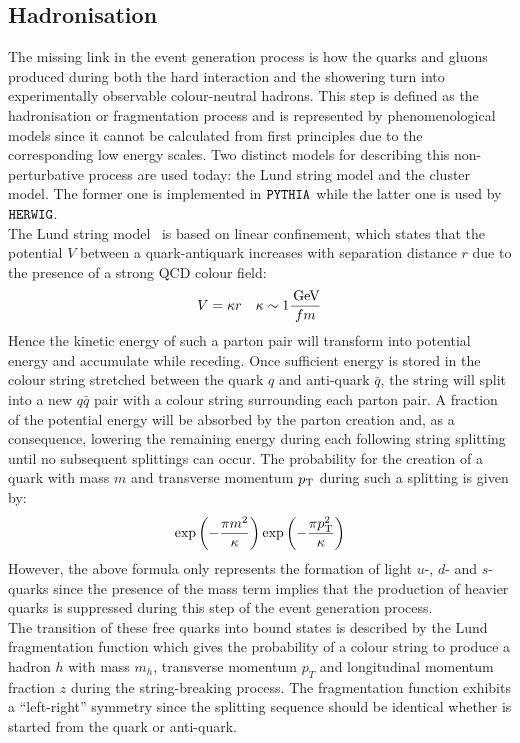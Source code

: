 \subsection{Hadronisation} \label{sec::Hadronisation}
The missing link in the event generation process is how the quarks and gluons produced during both the hard interaction and the showering turn into experimentally observable colour-neutral hadrons. This step is defined as the hadronisation or fragmentation process and is represented by phenomenological models since it cannot be calculated from first principles due to the corresponding low energy scales.
Two distinct models for describing this non-perturbative process are used today: the Lund string model and the cluster model. The former one is implemented in $\texttt{PYTHIA}$ while the latter one is used by $\texttt{HERWIG}$.
\\
The Lund string model~\cite{LUNDModel} is based on linear confinement, which states that the potential $V$ between a quark-antiquark increases with separation distance $r$ due to the presence of a strong QCD colour field: %
\begin{equation}\label{eq::VQCD}
 V = \kappa r ~~~ \kappa \sim 1 \dfrac{\, \mathrm{GeV}}{fm}
\end{equation}
Hence the kinetic energy of such a parton pair will transform into potential energy and accumulate while receding. 
Once sufficient energy is stored in the colour string stretched between the quark $q$ and anti-quark $\bar{q}$, the string will split into a new $q\bar{q}$ pair with a colour string surrounding each parton pair.
A fraction of the potential energy will be absorbed by the parton creation and, as a consequence, lowering the remaining energy during each following string splitting until no subsequent splittings can occur.
The probability for the creation of a quark with mass $m$ and transverse momentum $p_{\rm T}$ during such a splitting is given by:
\begin{equation}\label{eq::mBot}
 \exp \left( -\frac{\pi m^{2}}{\kappa} \right) \exp \left(-\frac{\pi p_{\rm T}^{2}}{\kappa} \right)
\end{equation}
However, the above formula only represents the formation of light $u$-, $d$- and $s$-quarks since the presence of the mass term implies that the production of heavier quarks is suppressed during this step of the event generation process. 
\\
The transition of these free quarks into bound states is described by the Lund fragmentation function which gives the probability of a colour string to produce a hadron $h$ with mass $m_{h}$, transverse momentum $p_{T}$ and longitudinal momentum fraction $z$ during the string-breaking process. The fragmentation function exhibits a ``left-right'' symmetry since the splitting sequence should be identical whether is started from the quark or anti-quark.
